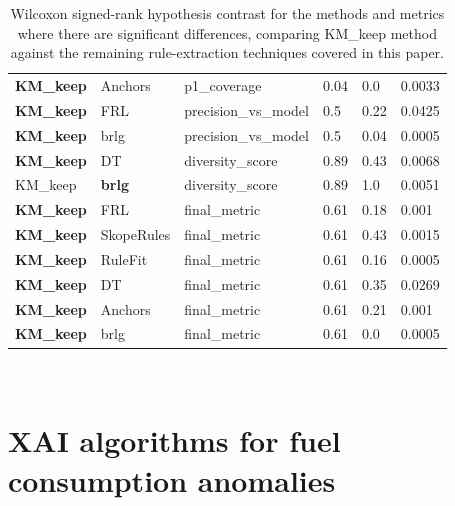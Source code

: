 \begin{table}[h!]
{\begin{tabular}{@{}llllll@{}}
\textbf{KM\_keep} & Anchors       & p1\_coverage         & 0.04    & 0.0     & 0.0033 \\
\textbf{KM\_keep} & FRL           & precision\_vs\_model & 0.5     & 0.22    & 0.0425 \\
\textbf{KM\_keep} & brlg          & precision\_vs\_model & 0.5     & 0.04    & 0.0005 \\
\textbf{KM\_keep} & DT            & diversity\_score     & 0.89    & 0.43    & 0.0068 \\
KM\_keep          & \textbf{brlg} & diversity\_score     & 0.89    & 1.0     & 0.0051 \\
\textbf{KM\_keep} & FRL           & final\_metric        & 0.61    & 0.18    & 0.001  \\
\textbf{KM\_keep} & SkopeRules    & final\_metric        & 0.61    & 0.43    & 0.0015 \\
\textbf{KM\_keep} & RuleFit       & final\_metric        & 0.61    & 0.16    & 0.0005 \\
\textbf{KM\_keep} & DT            & final\_metric        & 0.61    & 0.35    & 0.0269 \\
\textbf{KM\_keep} & Anchors       & final\_metric        & 0.61    & 0.21    & 0.001  \\
\textbf{KM\_keep} & brlg          & final\_metric        & 0.61    & 0.0     & 0.0005 \\ \bottomrule
\end{tabular}%
}
\caption{Wilcoxon signed-rank hypothesis contrast for the methods and metrics where there are significant differences, comparing KM\_keep method against the remaining rule-extraction techniques covered in this paper.}
\label{table:annex-rule-extraction-xai-metrics-H3-2}
\end{table}

\newpage 

\ %

\newpage


\section{XAI algorithms for fuel consumption anomalies}\label{sec:annex-xai-fuel}
